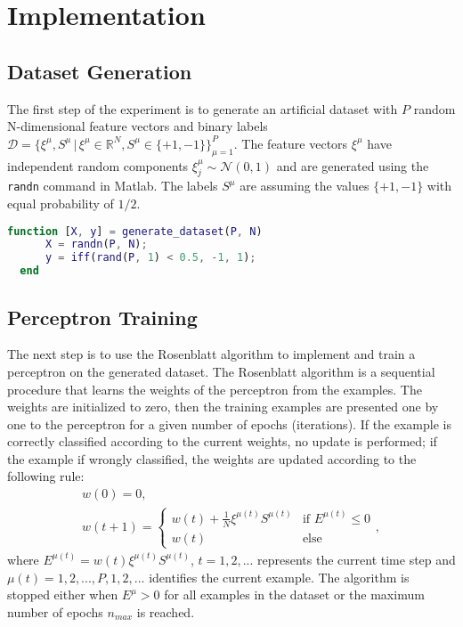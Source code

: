 \section{Implementation}

\subsection{Dataset Generation}
The first step of the experiment is to generate an artificial dataset with $P$ random N-dimensional feature vectors and binary labels $\mathcal{D} = \{ \xi^\mu, S^\mu \,|\, \xi^\mu \in \mathds{R}^N, S^\mu \in \{+1, -1\} \}_{\mu=1}^P$.
The feature vectors $\xi^\mu$ have independent random components $\xi_j^\mu \sim \mathcal{N}(0, 1)$ and are generated using the \texttt{randn} command in Matlab.
The labels $S^\mu$ are assuming the values $\{+1, -1\}$ with equal probability of $1/2$.

\begin{lstlisting}[language=Matlab]
  function [X, y] = generate_dataset(P, N)
      X = randn(P, N);
      y = iff(rand(P, 1) < 0.5, -1, 1);
  end
\end{lstlisting}

\subsection{Perceptron Training}
The next step is to use the Rosenblatt algorithm to implement and train a perceptron on the generated dataset.
The Rosenblatt algorithm is a sequential procedure that learns the weights of the perceptron from the examples.
The weights are initialized to zero, then the training examples are presented one by one to the perceptron for a given number of epochs (iterations).
If the example is correctly classified according to the current weights, no update is performed;
if the example if wrongly classified, the weights are updated according to the following rule:
\begin{gather} 
    w(0) = 0, \\
    w(t + 1) =  \begin{cases}
                    w(t) + \frac{1}{N} \xi^{\mu(t)} S^{\mu(t)} &\text{if $E^{\mu(t)} \leq 0$}\\
                    w(t) &\text{else}
                \end{cases},
    \label{eq:update-rule}
\end{gather}
where $E^{\mu(t)} = w(t) \xi^{\mu(t)} S^{\mu(t)}$, $t = 1, 2, ...$ represents the current time step and $\mu(t) = 1, 2, ..., P, 1, 2, ...$ identifies the current example.
The algorithm is stopped either when $E^\mu > 0$ for all examples in the dataset or the maximum number of epochs $n_{max}$ is reached.

